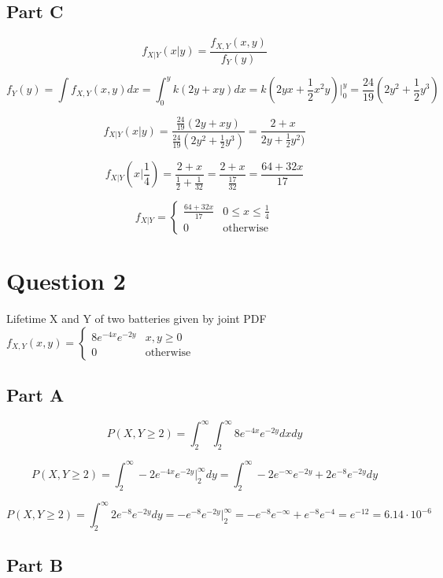 \documentclass[letterpaper]{article}
\begin{document}
\subsection*{Part C}

$$f_{X|Y} (x|y) = \frac{f_{X,Y}(x,y)}{f_Y(y)}$$

$$f_Y(y) = \int f_{X, Y}(x, y) dx = \int_0^y k(2y + xy) dx = k(2yx + \frac{1}{2} x^2y) \Big|_0^y = \frac{24}{19} (2y^2 + \frac{1}{2} y^3)$$

$$f_{X|Y} (x|y) = \frac{\frac{24}{19}(2y + xy)}{\frac{24}{19} (2y^2 + \frac{1}{2} y^3)} = \frac{2 + x}{2y + \frac{1}{2} y^2)}$$

$$f_{X|Y} (x|\frac{1}{4}) = \frac{2 + x}{\frac{1}{2} + \frac{1}{32}} = \frac{2 + x}{\frac{17}{32}} = \frac{64 + 32x}{17}$$

$$f_{X|Y} = \begin{cases} \frac{64 + 32x}{17} & 0 \leq x \leq \frac{1}{4} \\ 0 & \text{otherwise} \end{cases}$$

\newpage

\section*{Question 2}

Lifetime X and Y of two batteries given by joint PDF $f_{X,Y}(x, y) = \begin{cases} 8e^{-4x}e^{-2y} & x, y \geq 0 \\ 0 & \text{otherwise} \end{cases}$

\subsection*{Part A}

$$P(X, Y \geq 2) = \int_2^{\infty} \int_2^{\infty} 8e^{-4x}e^{-2y} dx dy$$

$$P(X, Y \geq 2) = \int_2^{\infty} -2e^{-4x}e^{-2y} \Big|_2^{\infty} dy = \int_2^{\infty} -2e^{-\infty}e^{-2y} + 2e^{-8}e^{-2y} dy$$

$$P(X, Y \geq 2) = \int_2^{\infty} 2e^{-8}e^{-2y} dy = -e^{-8}e^{-2y} \Big|_2^{\infty} = -e^{-8}e^{-\infty} + e^{-8}e^{-4} = e^{-12} = 6.14 \cdot 10^{-6}$$

\subsection*{Part B}
\end{document}
